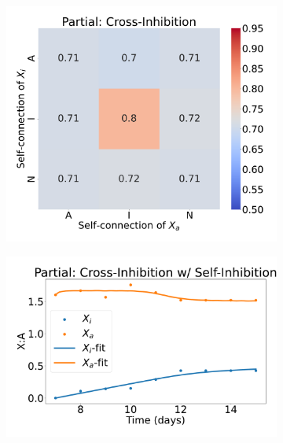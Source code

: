 \documentclass[11pt,a4paper]{article}
\begin{document}
\begin{figure}
\begin{subfigure}[c]{0.35\textwidth}
        \includegraphics[width=\textwidth]{vary_self-Partial_timeshifted-rsq-hmap}
        \caption{}
        \label{rsq-self-part}
    \end{subfigure}
    \begin{subfigure}[c]{0.32\textwidth}
        \includegraphics[width=\textwidth]{IIII-Partial_timeshifted-timeseries}
        \caption{}
        \label{IIII-part}
    \end{subfigure}
    \begin{subfigure}[c]{0.28\textwidth}

\end{subfigure}
\end{figure}
\end{document}
